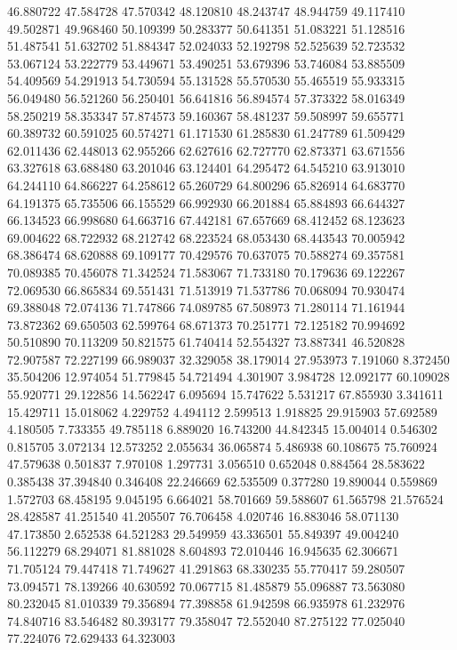 46.880722
47.584728
47.570342
48.120810
48.243747
48.944759
49.117410
49.502871
49.968460
50.109399
50.283377
50.641351
51.083221
51.128516
51.487541
51.632702
51.884347
52.024033
52.192798
52.525639
52.723532
53.067124
53.222779
53.449671
53.490251
53.679396
53.746084
53.885509
54.409569
54.291913
54.730594
55.131528
55.570530
55.465519
55.933315
56.049480
56.521260
56.250401
56.641816
56.894574
57.373322
58.016349
58.250219
58.353347
57.874573
59.160367
58.481237
59.508997
59.655771
60.389732
60.591025
60.574271
61.171530
61.285830
61.247789
61.509429
62.011436
62.448013
62.955266
62.627616
62.727770
62.873371
63.671556
63.327618
63.688480
63.201046
63.124401
64.295472
64.545210
63.913010
64.244110
64.866227
64.258612
65.260729
64.800296
65.826914
64.683770
64.191375
65.735506
66.155529
66.992930
66.201884
65.884893
66.644327
66.134523
66.998680
64.663716
67.442181
67.657669
68.412452
68.123623
69.004622
68.722932
68.212742
68.223524
68.053430
68.443543
70.005942
68.386474
68.620888
69.109177
70.429576
70.637075
70.588274
69.357581
70.089385
70.456078
71.342524
71.583067
71.733180
70.179636
69.122267
72.069530
66.865834
69.551431
71.513919
71.537786
70.068094
70.930474
69.388048
72.074136
71.747866
74.089785
67.508973
71.280114
71.161944
73.872362
69.650503
62.599764
68.671373
70.251771
72.125182
70.994692
50.510890
70.113209
50.821575
61.740414
52.554327
73.887341
46.520828
72.907587
72.227199
66.989037
32.329058
38.179014
27.953973
7.191060
8.372450
35.504206
12.974054
51.779845
54.721494
4.301907
3.984728
12.092177
60.109028
55.920771
29.122856
14.562247
6.095694
15.747622
5.531217
67.855930
3.341611
15.429711
15.018062
4.229752
4.494112
2.599513
1.918825
29.915903
57.692589
4.180505
7.733355
49.785118
6.889020
16.743200
44.842345
15.004014
0.546302
0.815705
3.072134
12.573252
2.055634
36.065874
5.486938
60.108675
75.760924
47.579638
0.501837
7.970108
1.297731
3.056510
0.652048
0.884564
28.583622
0.385438
37.394840
0.346408
22.246669
62.535509
0.377280
19.890044
0.559869
1.572703
68.458195
9.045195
6.664021
58.701669
59.588607
61.565798
21.576524
28.428587
41.251540
41.205507
76.706458
4.020746
16.883046
58.071130
47.173850
2.652538
64.521283
29.549959
43.336501
55.849397
49.004240
56.112279
68.294071
81.881028
8.604893
72.010446
16.945635
62.306671
71.705124
79.447418
71.749627
41.291863
68.330235
55.770417
59.280507
73.094571
78.139266
40.630592
70.067715
81.485879
55.096887
73.563080
80.232045
81.010339
79.356894
77.398858
61.942598
66.935978
61.232976
74.840716
83.546482
80.393177
79.358047
72.552040
87.275122
77.025040
77.224076
72.629433
64.323003
